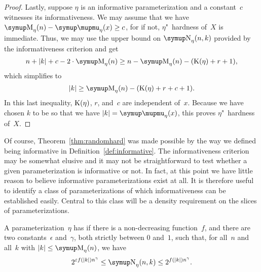 \begin{proof}
  Lastly, suppose $\eta$ is an informative parameterization and a constant~$c$ witnesses its informativeness.
  We may assume that we have $\upM_\eta(n) - \mu_\eta(x) \ge c$, for if not, $\eta$"~hardness of~$X$ is immediate.
  Thus, we may use the upper bound on $\upN_\eta(n, k)$ provided by the informativeness criterion and get
  \begin{equation*}
    n + \length{k} + c - 2 \cdot \upM_\eta(n) \ge n - \upM_\eta(n) - (\KC(\eta) + r + 1),
  \end{equation*}
  which simplifies to
  \begin{equation*}
    \length{k} \ge \upM_\eta(n) - (\KC(\eta) + r + c + 1).
  \end{equation*}
  In this last inequality, $\operatorname{K}(\eta)$, $r$, and~$c$ are independent of~$x$.
  Because we have chosen $k$ to be so that we have $\length{k} = \mu_\eta(x)$, this proves $\eta$"~hardness of~$X$.
\end{proof}

Of course, Theorem~\ref{thm:randomhard} was made possible by the way we defined being informative in Definition~\ref{def:informative}.
The informativeness criterion may be somewhat elusive and it may not be straightforward to test whether a given parameterization is informative or not.
In fact, at this point we have little reason to believe informative parameterizations exist at all.
It is therefore useful to identify a class of parameterizations of which informativeness can be established easily.
Central to this class will be a density requirement on the slices of parameterizations.
\begin{definition}
  A parameterization~$\eta$ has  if there is a non-decreasing function~$f$, and there are two constants~$\epsilon$ and~$\gamma$, both strictly between $0$ and~$1$, such that, for all~$n$ and all~$k$ with $\length{k} \le \upM_\eta(n)$, we have
\begin{equation*}
  2^{\epsilon f(\length{k}) n^\gamma} \le \upN_\eta(n, k) \le 2^{f(\length{k}) n^\gamma}.
\end{equation*}
\end{definition}

